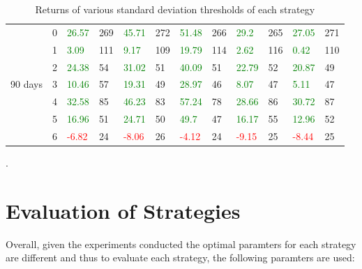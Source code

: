 \begin{table}[!htb]
\begin{adjustwidth}{-0.8in}{-0.9in}
\begin{tabular}{|p{4em}|p{2em}|p{3em}|p{3em}|p{3em}|p{3em}|p{3em}|p{3em}|p{3em}|p{3em}|p{3em}|p{3em}|}
            & 0 & \textcolor{green}{26.57} & 269 & \textcolor{green}{45.71} & 272 & \textcolor{green}{51.48} & 266 & \textcolor{green}{29.2} & 265 & \textcolor{green}{27.05} & 271\\\cline{3-12}
            & 1 & \textcolor{green}{3.09} & 111 & \textcolor{green}{9.17} & 109 & \textcolor{green}{19.79} & 114 & \textcolor{green}{2.62} & 116 & \textcolor{green}{0.42} & 110\\\cline{3-12}
            & 2 & \textcolor{green}{24.38} & 54 & \textcolor{green}{31.02} & 51 & \textcolor{green}{40.09} & 51 & \textcolor{green}{22.79} & 52 & \textcolor{green}{20.87} & 49\\\cline{3-12}
            90 days & 3 & \textcolor{green}{10.46} & 57 & \textcolor{green}{19.31} & 49 & \textcolor{green}{28.97} & 46 & \textcolor{green}{8.07} & 47 & \textcolor{green}{5.11} & 47\\\cline{3-12}
            & 4 & \textcolor{green}{32.58} & 85 & \textcolor{green}{46.23} & 83 & \textcolor{green}{57.24} & 78 & \textcolor{green}{28.66} & 86 & \textcolor{green}{30.72} & 87\\\cline{3-12}
            & 5 & \textcolor{green}{16.96} & 51 & \textcolor{green}{24.71} & 50 & \textcolor{green}{49.7} & 47 & \textcolor{green}{16.17} & 55 & \textcolor{green}{12.96} & 52\\\cline{3-12}
            & 6 & \textcolor{red}{-6.82} & 24 & \textcolor{red}{-8.06} & 26 & \textcolor{red}{-4.12} & 24 & \textcolor{red}{-9.15} & 25 & \textcolor{red}{-8.44} & 25\\\hline
            
        \end{tabular}
    \end{adjustwidth}
    \caption{Returns of various standard deviation thresholds of each strategy \label{tab:VaryWS}}.
\end{table}

\section{Evaluation of Strategies}
Overall, given the experiments conducted the optimal paramters for each strategy are different and thus to evaluate each strategy, the following paramters are used:

